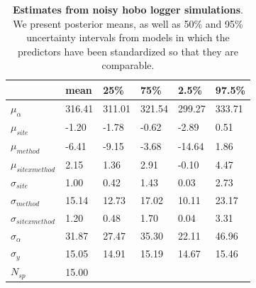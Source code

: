 \documentclass{article}\usepackage[]{graphicx}\usepackage[]{color}
\begin{document}
\begin{table}[ht]
\centering
\caption{\textbf{Estimates from noisy hobo logger simulations}. We present posterior means, as well as 50\% and 95\% uncertainty intervals from models in which the predictors have been standardized so that they are comparable.} 
\label{tab:noisyhobo}
\begingroup\footnotesize
\begin{tabular}{|p{}|p{}p{}p{}p{}p{}|}
  \hline
 & mean & 25\% & 75\% & 2.5\% & 97.5\% \\ 
  \hline
$\mu_{\alpha}$ & 316.41 & 311.01 & 321.54 & 299.27 & 333.71 \\ 
  $\mu_{site}$ & -1.20 & -1.78 & -0.62 & -2.89 & 0.51 \\ 
  $\mu_{method}$ & -6.41 & -9.15 & -3.68 & -14.64 & 1.86 \\ 
  $\mu_{sitexmethod}$ & 2.15 & 1.36 & 2.91 & -0.10 & 4.47 \\ 
  $\sigma_{site}$ & 1.00 & 0.42 & 1.43 & 0.03 & 2.73 \\ 
  $\sigma_{method}$ & 15.14 & 12.73 & 17.02 & 10.11 & 23.17 \\ 
  $\sigma_{sitexmethod}$ & 1.20 & 0.48 & 1.70 & 0.04 & 3.31 \\ 
  $\sigma_{\alpha}$ & 31.87 & 27.47 & 35.30 & 22.11 & 46.96 \\ 
  $\sigma_{y}$ & 15.05 & 14.91 & 15.19 & 14.67 & 15.46 \\ 
   \hline
$N_{sp}$ & 15.00 &  &  &  &  \\ 
   \hline
\end{tabular}
\endgroup
\end{table}
\end{document}
